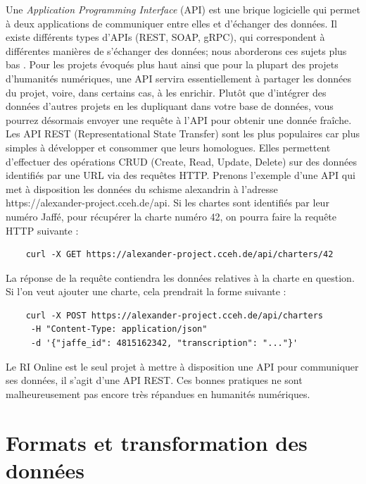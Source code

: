 Une \textit{Application Programming Interface} (API) est une brique logicielle qui permet à deux applications de communiquer entre elles et d’échanger des données. Il existe différents types d’APIs (REST, SOAP, gRPC), qui correspondent à différentes manières de s’échanger des données; nous aborderons ces sujets plus bas . Pour les projets évoqués plus haut ainsi que pour la plupart des projets d’humanités numériques, une API servira essentiellement à partager les données du projet, voire, dans certains cas, à les enrichir. Plutôt que d’intégrer des données d’autres projets en les dupliquant dans votre base de données, vous pourrez désormais envoyer une requête à l’API pour obtenir une donnée fraîche.  
Les API REST (Representational State Transfer) sont les plus populaires car plus simples à développer et consommer que leurs homologues. Elles permettent d’effectuer des opérations CRUD (Create, Read, Update, Delete) sur des données identifiés par une URL via des requêtes HTTP. Prenons l’exemple d’une API qui met à disposition les données du schisme alexandrin à l’adresse https://alexander-project.cceh.de/api. Si les chartes sont identifiés par leur numéro Jaffé, pour récupérer la charte numéro 42, on pourra faire la requête HTTP suivante : 
\begin{lstlisting}
    curl -X GET https://alexander-project.cceh.de/api/charters/42
\end{lstlisting}

\noindent La réponse de la requête contiendra les données relatives à la charte en question. 
Si l’on veut ajouter une charte, cela prendrait la forme suivante : 

\begin{lstlisting}
    curl -X POST https://alexander-project.cceh.de/api/charters
     -H "Content-Type: application/json"
     -d '{"jaffe_id": 4815162342, "transcription": "..."}' 
\end{lstlisting}


\noindent Le RI Online est le seul projet à mettre à disposition une API pour communiquer ses données, il s’agit d’une API REST. Ces bonnes pratiques ne sont malheureusement pas encore très répandues en humanités numériques.


    \section{Formats et transformation des données}

